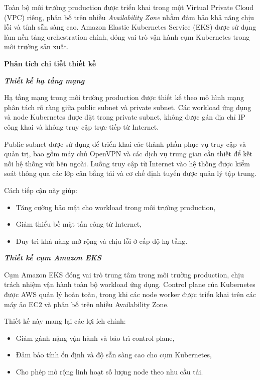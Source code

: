 Toàn bộ môi trường production được triển khai trong một Virtual Private Cloud (VPC) riêng,
phân bố trên nhiều \textit{Availability Zone} nhằm đảm bảo khả năng chịu lỗi và tính sẵn sàng cao.
Amazon Elastic Kubernetes Service (EKS) được sử dụng làm nền tảng orchestration chính,
đóng vai trò vận hành cụm Kubernetes trong môi trường sản xuất.

\textbf{Phân tích chi tiết thiết kế}

\textit{\textbf{Thiết kế hạ tầng mạng}}

Hạ tầng mạng trong môi trường production được thiết kế theo mô hình mạng phân tách rõ ràng
giữa public subnet và private subnet. Các workload ứng dụng và node Kubernetes được đặt
trong private subnet, không được gán địa chỉ IP công khai và không truy cập trực tiếp từ Internet.

Public subnet được sử dụng để triển khai các thành phần phục vụ truy cập và quản trị,
bao gồm máy chủ OpenVPN và các dịch vụ trung gian cần thiết để kết nối hệ thống với bên ngoài.
Luồng truy cập từ Internet vào hệ thống được kiểm soát thông qua các lớp cân bằng tải
và cơ chế định tuyến được quản lý tập trung.

Cách tiếp cận này giúp:
\begin{itemize}
    \item Tăng cường bảo mật cho workload trong môi trường production,
    \item Giảm thiểu bề mặt tấn công từ Internet,
    \item Duy trì khả năng mở rộng và chịu lỗi ở cấp độ hạ tầng.
\end{itemize}

\textit{\textbf{Thiết kế cụm Amazon EKS}}

Cụm Amazon EKS đóng vai trò trung tâm trong môi trường production, chịu trách nhiệm vận hành
toàn bộ workload ứng dụng. Control plane của Kubernetes được AWS quản lý hoàn toàn,
trong khi các node worker được triển khai trên các máy ảo EC2 và phân bố trên nhiều
Availability Zone.

Thiết kế này mang lại các lợi ích chính:
\begin{itemize}
    \item Giảm gánh nặng vận hành và bảo trì control plane,
    \item Đảm bảo tính ổn định và độ sẵn sàng cao cho cụm Kubernetes,
    \item Cho phép mở rộng linh hoạt số lượng node theo nhu cầu tải.
\end{itemize}

